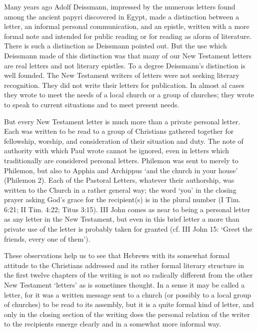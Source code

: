 \begin{enumerate}
Many years ago Adolf Deissmann, impressed by the numerous letters found among
the ancient papyri discovered in Egypt, made a distinction between a letter, an
informal personal communication, and an epistle, written with a more formal note
and intended for public reading or for reading as aform of literature.
There is such a distinction as Deissmann pointed out.
But the use which Deissmann made of this distinction was that many of our New
Testament letters are real letters and not literary epistles.
To a degree Deissmann's distinction is well founded.
The New Testament writers of letters were not seeking literary recognition.
They did not write their letters for publication.
In almost al cases they wrote to meet the needs of a local church or a group of
churches; they wrote to speak to current situations and to meet present needs.
\newline

But every New Testament letter is much more than a private personal letter.
Each was written to be read to a group of Christians gathered together for
fellowship, worship, and consideration of their situation and duty.
The note of authority with which Paul wrote cannot be ignored, even in letters
which traditionally are considered personal letters.
Philemon was sent to merely to Philemon, but also to Apphia and Archippus `and
the church in your house' (Philemon 2).
Each of the Pastoral Letters, whatever their authorship, was written to the
Church in a rather general way; the word `you' in the closing prayer asking
God's grace for the recipient(s) is in the plural number (I Tim. 6:21; II Tim.
4:22; Titus 3:15).
III John comes as near to being a personal letter as any letter in the New
Testament, but even in this brief letter a more than private use of the letter
is probably taken for granted (cf. III John 15: `Greet the friends, every one of
them').
\newline

These observations help us to see that Hebrews with its somewhat formal attitude
to the Christians addressed and its rather formal literary structure in the
first twelve chapters of the writing is not so radically different from the
other New Testament `letters' as is sometimes thought.
In a sense it may be called a letter, for it was a written message sent to a
church (or possibly to a local group of churches) to be read to its assembly,
but it is a quite formal kind of letter, and only in the closing section of the
writing does the personal relation of the writer to the recipients emerge
clearly and in a somewhat more informal way.


\end{enumerate}
